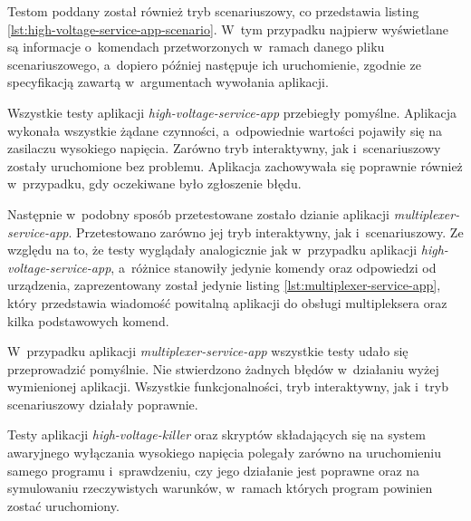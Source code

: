 Testom poddany został również tryb scenariuszowy, co przedstawia listing \ref{lst:high-voltage-service-app-scenario}. W~tym przypadku najpierw wyświetlane są informacje o~komendach przetworzonych w~ramach danego pliku scenariuszowego, a~dopiero później następuje ich uruchomienie, zgodnie ze specyfikacją zawartą w~argumentach wywołania aplikacji.



Wszystkie testy aplikacji \emph{high-voltage-service-app} przebiegły pomyślne. Aplikacja wykonała wszystkie żądane czynności, a~odpowiednie wartości pojawiły się na zasilaczu wysokiego napięcia. Zarówno tryb interaktywny, jak i~scenariuszowy zostały uruchomione bez problemu. Aplikacja zachowywała się poprawnie również w~przypadku, gdy oczekiwane było zgłoszenie błędu.

Następnie w~podobny sposób przetestowane zostało dzianie aplikacji \emph{multiplexer-service-app}. Przetestowano zarówno jej tryb interaktywny, jak i~scenariuszowy. Ze względu na to, że testy wyglądały analogicznie jak w~przypadku aplikacji \emph{high-voltage-service-app}, a~różnice stanowiły jedynie komendy oraz odpowiedzi od urządzenia, zaprezentowany został jedynie listing \ref{lst:multiplexer-service-app}, który przedstawia wiadomość powitalną aplikacji do obsługi multipleksera oraz kilka podstawowych komend.

\clearpage


W~przypadku aplikacji \emph{multiplexer-service-app} wszystkie testy udało się przeprowadzić pomyślnie. Nie stwierdzono żadnych błędów w~działaniu wyżej wymienionej aplikacji. Wszystkie funkcjonalności, tryb interaktywny, jak i~tryb scenariuszowy działały poprawnie.

\clearpage
Testy aplikacji \emph{high-voltage-killer} oraz skryptów składających się na system awaryjnego wyłączania wysokiego napięcia polegały zarówno na uruchomieniu samego programu i~sprawdzeniu, czy jego działanie jest poprawne oraz na symulowaniu rzeczywistych warunków, w~ramach których program powinien zostać uruchomiony. 


